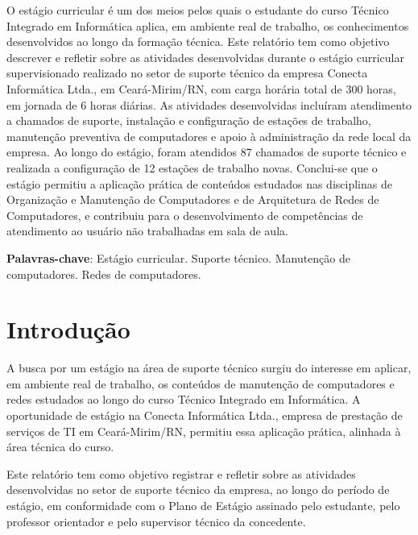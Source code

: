 \documentclass[article,12pt,a4paper]{abntex2}
\begin{document}
\maketitle

\begin{resumo}
O estágio curricular é um dos meios pelos quais o estudante do curso
Técnico Integrado em Informática aplica, em ambiente real de trabalho, os
conhecimentos desenvolvidos ao longo da formação técnica. Este relatório
tem como objetivo descrever e refletir sobre as atividades desenvolvidas
durante o estágio curricular supervisionado realizado no setor de suporte
técnico da empresa Conecta Informática Ltda., em Ceará-Mirim/RN, com carga
horária total de 300 horas, em jornada de 6 horas diárias. As atividades
desenvolvidas incluíram atendimento a chamados de suporte, instalação e
configuração de estações de trabalho, manutenção preventiva de
computadores e apoio à administração da rede local da empresa. Ao longo do
estágio, foram atendidos 87 chamados de suporte técnico e realizada a
configuração de 12 estações de trabalho novas. Conclui-se que o estágio
permitiu a aplicação prática de conteúdos estudados nas disciplinas de
Organização e Manutenção de Computadores e de Arquitetura de Redes de
Computadores, e contribuiu para o desenvolvimento de competências de
atendimento ao usuário não trabalhadas em sala de aula.

\vspace{\onelineskip}
\noindent
\textbf{Palavras-chave}: Estágio curricular. Suporte técnico. Manutenção de computadores. Redes de computadores.
\end{resumo}

\textual

\section{Introdução}

A busca por um estágio na área de suporte técnico surgiu do interesse em
aplicar, em ambiente real de trabalho, os conteúdos de manutenção de
computadores e redes estudados ao longo do curso Técnico Integrado em
Informática. A oportunidade de estágio na Conecta Informática Ltda.,
empresa de prestação de serviços de TI em Ceará-Mirim/RN, permitiu essa
aplicação prática, alinhada à área técnica do curso.

Este relatório tem como objetivo registrar e refletir sobre as atividades
desenvolvidas no setor de suporte técnico da empresa, ao longo do período
de estágio, em conformidade com o Plano de Estágio assinado pelo
estudante, pelo professor orientador e pelo supervisor técnico da
concedente.
\end{document}
